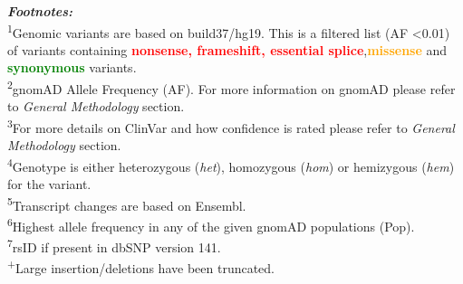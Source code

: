 \textbf{\textit{Footnotes:}}
\\
\textsuperscript{1}Genomic variants are based on build37/hg19. This is a filtered list (AF \textless 0.01) of variants containing \textcolor{red}{\textbf{nonsense, frameshift, essential splice}},\textcolor{Orange}{\textbf{missense}} and \textcolor{Green}{\textbf{synonymous}} variants.
\\
\textsuperscript{2}gnomAD Allele Frequency (AF). For more information on gnomAD please refer to \textit{General Methodology} section.
\\
\textsuperscript{3}For more details on ClinVar and how confidence is rated please refer to \textit{General Methodology} section.
\\
\textsuperscript{4}Genotype is either heterozygous (\textit{het}), homozygous (\textit{hom}) or hemizygous (\textit{hem}) for the variant.
\\
\textsuperscript{5}Transcript changes are based on Ensembl.
\\
\textsuperscript{6}Highest allele frequency in any of the given gnomAD populations (Pop).
\\
\textsuperscript{7}rsID if present in dbSNP version 141.
\\
\textsuperscript{+}Large insertion/deletions have been truncated.
\newpage

